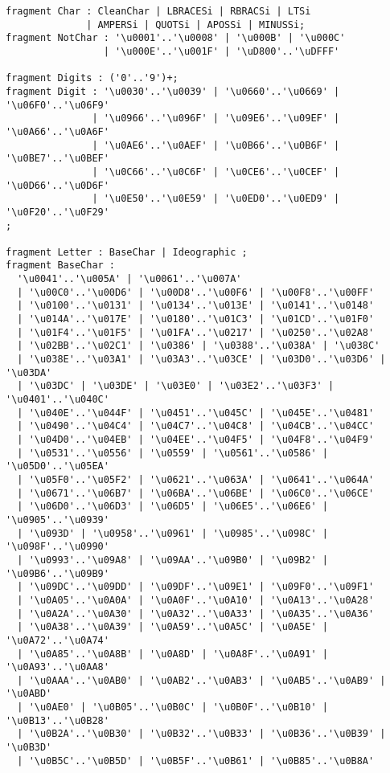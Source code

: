 \begin{verbatim}
fragment Char : CleanChar | LBRACESi | RBRACSi | LTSi 
              | AMPERSi | QUOTSi | APOSSi | MINUSSi;
fragment NotChar : '\u0001'..'\u0008' | '\u000B' | '\u000C' 
                 | '\u000E'..'\u001F' | '\uD800'..'\uDFFF' 

fragment Digits : ('0'..'9')+;
fragment Digit : '\u0030'..'\u0039' | '\u0660'..'\u0669' | '\u06F0'..'\u06F9' 
               | '\u0966'..'\u096F' | '\u09E6'..'\u09EF' | '\u0A66'..'\u0A6F' 
               | '\u0AE6'..'\u0AEF' | '\u0B66'..'\u0B6F' | '\u0BE7'..'\u0BEF' 
               | '\u0C66'..'\u0C6F' | '\u0CE6'..'\u0CEF' | '\u0D66'..'\u0D6F' 
               | '\u0E50'..'\u0E59' | '\u0ED0'..'\u0ED9' | '\u0F20'..'\u0F29' 
;

fragment Letter : BaseChar | Ideographic ;
fragment BaseChar : 
  '\u0041'..'\u005A' | '\u0061'..'\u007A' 
  | '\u00C0'..'\u00D6' | '\u00D8'..'\u00F6' | '\u00F8'..'\u00FF' 
  | '\u0100'..'\u0131' | '\u0134'..'\u013E' | '\u0141'..'\u0148' 
  | '\u014A'..'\u017E' | '\u0180'..'\u01C3' | '\u01CD'..'\u01F0' 
  | '\u01F4'..'\u01F5' | '\u01FA'..'\u0217' | '\u0250'..'\u02A8' 
  | '\u02BB'..'\u02C1' | '\u0386' | '\u0388'..'\u038A' | '\u038C' 
  | '\u038E'..'\u03A1' | '\u03A3'..'\u03CE' | '\u03D0'..'\u03D6' | '\u03DA' 
  | '\u03DC' | '\u03DE' | '\u03E0' | '\u03E2'..'\u03F3' | '\u0401'..'\u040C' 
  | '\u040E'..'\u044F' | '\u0451'..'\u045C' | '\u045E'..'\u0481' 
  | '\u0490'..'\u04C4' | '\u04C7'..'\u04C8' | '\u04CB'..'\u04CC'
  | '\u04D0'..'\u04EB' | '\u04EE'..'\u04F5' | '\u04F8'..'\u04F9' 
  | '\u0531'..'\u0556' | '\u0559' | '\u0561'..'\u0586' | '\u05D0'..'\u05EA' 
  | '\u05F0'..'\u05F2' | '\u0621'..'\u063A' | '\u0641'..'\u064A' 
  | '\u0671'..'\u06B7' | '\u06BA'..'\u06BE' | '\u06C0'..'\u06CE' 
  | '\u06D0'..'\u06D3' | '\u06D5' | '\u06E5'..'\u06E6' | '\u0905'..'\u0939' 
  | '\u093D' | '\u0958'..'\u0961' | '\u0985'..'\u098C' | '\u098F'..'\u0990' 
  | '\u0993'..'\u09A8' | '\u09AA'..'\u09B0' | '\u09B2' | '\u09B6'..'\u09B9' 
  | '\u09DC'..'\u09DD' | '\u09DF'..'\u09E1' | '\u09F0'..'\u09F1' 
  | '\u0A05'..'\u0A0A' | '\u0A0F'..'\u0A10' | '\u0A13'..'\u0A28' 
  | '\u0A2A'..'\u0A30' | '\u0A32'..'\u0A33' | '\u0A35'..'\u0A36' 
  | '\u0A38'..'\u0A39' | '\u0A59'..'\u0A5C' | '\u0A5E' | '\u0A72'..'\u0A74' 
  | '\u0A85'..'\u0A8B' | '\u0A8D' | '\u0A8F'..'\u0A91' | '\u0A93'..'\u0AA8' 
  | '\u0AAA'..'\u0AB0' | '\u0AB2'..'\u0AB3' | '\u0AB5'..'\u0AB9' | '\u0ABD' 
  | '\u0AE0' | '\u0B05'..'\u0B0C' | '\u0B0F'..'\u0B10' | '\u0B13'..'\u0B28' 
  | '\u0B2A'..'\u0B30' | '\u0B32'..'\u0B33' | '\u0B36'..'\u0B39' | '\u0B3D' 
  | '\u0B5C'..'\u0B5D' | '\u0B5F'..'\u0B61' | '\u0B85'..'\u0B8A' 

\end{verbatim}
